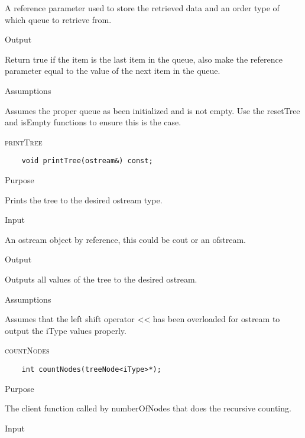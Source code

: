 \documentclass[pdftex, 12pt]{article}
\begin{document}
\begin{description}
\begin{description}
				A reference parameter used to store the retrieved data and an order type of which queue to retrieve
				from.

			\item{Output}

				Return true if the item is the last item in the queue, also make the reference parameter equal to the
				value of the next item in the queue.

			\item{Assumptions}

				Assumes the proper queue as been initialized and is not empty.  Use the resetTree and isEmpty functions
				to ensure this is the case.

		\end{description}
	\item{\textsc{printTree}}
\begin{lstlisting}
	void printTree(ostream&) const;
\end{lstlisting}
		\begin{description}

			\item{Purpose}

				Prints the tree to the desired ostream type.

			\item{Input}

				An ostream object by reference, this could be cout or an ofstream.

			\item{Output}

				Outputs all values of the tree to the desired ostream.

			\item{Assumptions}

				Assumes that the left shift operator << has been overloaded for ostream to output the iType values
				properly.

		\end{description}
	\item{\textsc{countNodes}}
\begin{lstlisting}
	int countNodes(treeNode<iType>*);
\end{lstlisting}
		\begin{description}

			\item{Purpose}

				The client function called by numberOfNodes that does the recursive counting.

			\item{Input}


\end{description}
\end{description}
\end{document}
